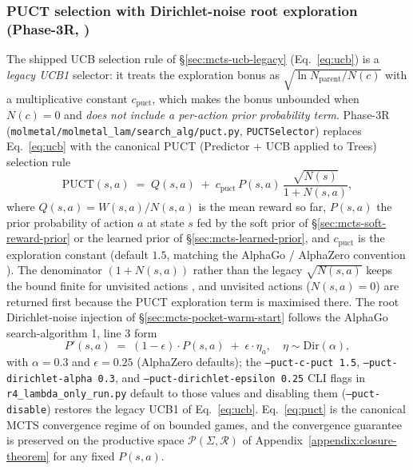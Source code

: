 \subsubsection{PUCT selection with Dirichlet-noise root exploration
(Phase-3R, \DESIGN{})}
\label{sec:mcts-puct-dirichlet}

The shipped UCB selection rule of
\S\ref{sec:mcts-ucb-legacy} (Eq.~\eqref{eq:ucb}) is a
\emph{legacy UCB1} selector: it treats the exploration bonus as
$\sqrt{\ln N_{\text{parent}} / N(c)}$ with a multiplicative
constant $c_{\text{puct}}$, which makes the bonus unbounded
when $N(c)=0$ and \emph{does not include a per-action prior
probability term}.  Phase-3R
(\texttt{molmetal/molmetal\_lam/search\_alg/puct.py},
\texttt{PUCTSelector}) replaces Eq.~\eqref{eq:ucb} with the
canonical PUCT (Predictor + UCB applied to Trees) selection
rule \cite{rosin2011puct}
\begin{equation}
  \label{eq:puct}
  \mathrm{PUCT}(s, a) \;=\; Q(s, a) \;+\; c_{\text{puct}}\,
                                    P(s, a)\,
                                    \frac{\sqrt{N(s)}}{1 + N(s, a)},
\end{equation}
where $Q(s, a) = W(s, a) / N(s, a)$ is the mean reward so far,
$P(s, a)$ the prior probability of action $a$ at state $s$
fed by the soft prior of \S\ref{sec:mcts-soft-reward-prior}
or the learned prior of \S\ref{sec:mcts-learned-prior}, and
$c_{\text{puct}}$ is the exploration constant (default $1.5$,
matching the AlphaGo / AlphaZero convention
\cite{silver2016alphago, silver2017alphagozero}).  The
denominator $(1 + N(s, a))$ rather than the legacy $\sqrt{N(s, a)}$
keeps the bound finite for unvisited actions
\cite{auer2002ucb, rosin2011puct}, and unvisited actions
($N(s, a)=0$) are returned first because the PUCT exploration
term is maximised there.  The root Dirichlet-noise injection
of \S\ref{sec:mcts-pocket-warm-start} follows the AlphaGo
search-algorithm 1, line 3 form
\cite{silver2016alphago}
\begin{equation}
  \label{eq:dirichlet-mix}
  P'(s, a) \;=\; (1 - \epsilon)\cdot P(s, a) \;+\;
               \epsilon\cdot\eta_a,
  \quad \eta \sim \mathrm{Dir}(\alpha),
\end{equation}
with $\alpha = 0.3$ and $\epsilon = 0.25$ (AlphaZero defaults);
the \texttt{--puct-c-puct 1.5},
\texttt{--puct-dirichlet-alpha 0.3}, and
\texttt{--puct-dirichlet-epsilon 0.25} CLI flags in
\texttt{r4\_lambda\_only\_run.py} default to those values and
disabling them (\texttt{--puct-disable}) restores the legacy
UCB1 of Eq.~\eqref{eq:ucb}.  Eq.~\eqref{eq:puct} is the
canonical MCTS convergence regime of
\cite{auger2013mcts} on bounded games, and the convergence
guarantee is preserved on the productive space
$\mathcal{P}(\Sigma, \mathcal{R})$ of
Appendix~\ref{appendix:closure-theorem} for any fixed $P(s, a)$.

